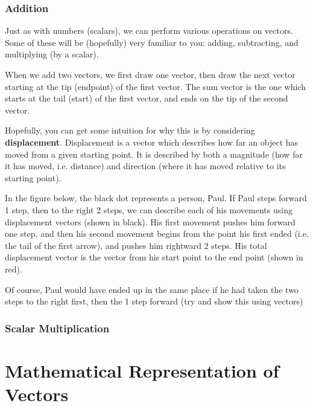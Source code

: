 \documentclass[
	11pt, %
	fleqn, %
	a4paper, %
]{../../styles/LegrandOrangeBook}
\begin{document}
\subsubsection{Addition}

Just as with numbers (scalars), we can perform various operations on vectors. Some of these will be (hopefully) very familiar to you: adding, subtracting, and multiplying (by a scalar).

When we add two vectors, we first draw one vector, then draw the next vector starting at the tip (endpoint) of the first vector. The sum vector is the one which starts at the tail (start) of the first vector, and ends on the tip of the second vector.

Hopefully, you can get some intuition for why this is by considering \textbf{displacement}. Displacement is a vector which describes how far an object has moved from a given starting point. It is described by both a magnitude (how far it has moved, i.e. distance) and direction (where it has moved relative to its starting point). 

In the figure below, the black dot represents a person, Paul. If Paul steps forward 1 step, then to the right 2 steps, we can describe each of his movements using displacement vectors (shown in black). His first movement pushes him forward one step, and then his second movement begins from the point his first ended (i.e. the tail of the first arrow), and pushes him rightward 2 steps. His total displacement vector is the vector from his start point to the end point (shown in red).

\begin{remark}
	Of course, Paul would have ended up in the same place if he had taken the two steps to the right first, then the 1 step forward (try and show this using vectors)
\end{remark} 


\subsubsection{Scalar Multiplication}



\section{Mathematical Representation of Vectors}
\end{document}
